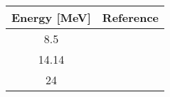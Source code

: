 \begin{tabular}{c c} 
    \toprule
    \bf{Energy [MeV]} & \bf{Reference} \\
    \midrule
    8.5 & \cite{Choudry2006}\\
    14.14 & \cite{Meier1969}\\
    24 & \cite{Grabmayr1980}\\
    \bottomrule
\end{tabular}
